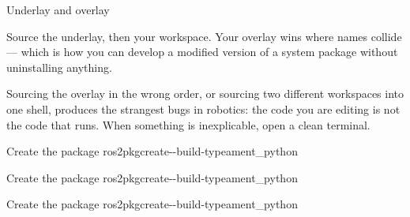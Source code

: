 \documentclass[aspectratio=169]{beamer}
\begin{document}
\begin{frame}{Underlay and overlay}
  \begin{center}
  \end{center}

  \vspace{0.5em}
  \small
  Source the underlay, then your workspace. Your overlay wins where names collide --- which is
  how you can develop a modified version of a system package without uninstalling anything.

  \vspace{0.5em}
  \begin{inthefield}
    \footnotesize
    Sourcing the overlay in the wrong order, or sourcing two different workspaces into one
    shell, produces the strangest bugs in robotics: the code you are editing is not the code
    that runs. When something is inexplicable, open a clean terminal.
  \end{inthefield}
\end{frame}

\begin{frame}{Create the package}
    {ros2}{pkg}{create}{-{}-build-type}{ament\_python}
\end{frame}

\begin{frame}{Create the package}
    {ros2}{pkg}{create}{-{}-build-type}{ament\_python}
\end{frame}

\begin{frame}{Create the package}
    {ros2}{pkg}{create}{-{}-build-type}{ament\_python}
\end{frame}
\end{document}
